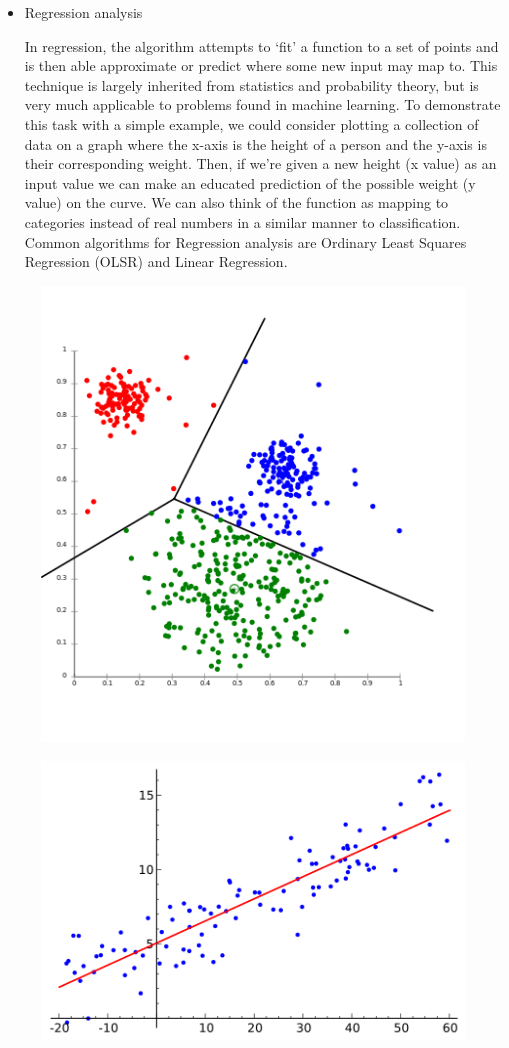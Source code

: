 \documentclass[12pt]{article}
\begin{document}
\begin{enumerate}
\begin{itemize}
    \item Regression analysis
    
    In regression, the algorithm attempts to `fit' a function to a set of points and is then able approximate or predict where some new input may map to. This technique is largely inherited from statistics and probability theory, but is very much applicable to problems found in machine learning. To demonstrate this task with a simple example, we could consider plotting a collection of data on a graph where the x-axis is the height of a person and the y-axis is their corresponding weight. Then, if we're given a new height (x value) as an input value we can make an educated prediction of the possible weight (y value) on the curve. We can also think of the function as mapping to categories instead of real numbers in a similar manner to classification. Common algorithms for Regression analysis are Ordinary Least Squares Regression (OLSR) and Linear Regression.
    
    
\end{itemize}

\begin{figure}[b]
\centering
\begin{minipage}{.5\textwidth}
  \centering
  \includegraphics[width=.46\linewidth]{clustering.png}
  \label{fig:test2}
\end{minipage}%
\begin{minipage}{.5\textwidth}
  \centering
  \includegraphics[width=.72\linewidth]{Linear_regression.png}
  \label{fig:test1}
\end{minipage}%
\end{figure}


\end{enumerate}
\end{document}
